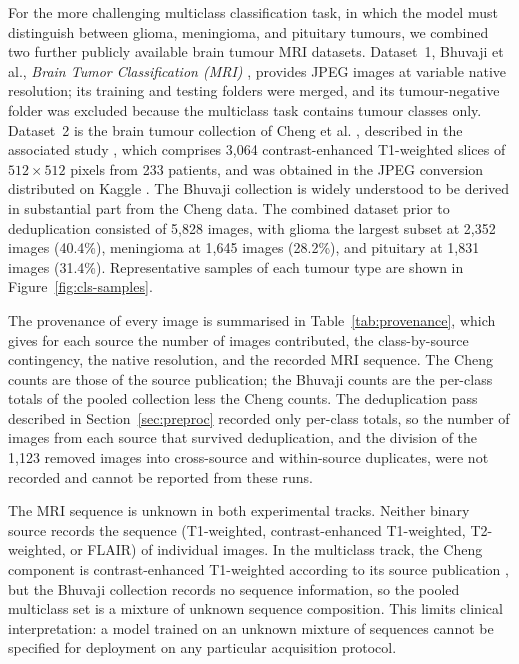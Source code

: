 \documentclass[final,3p,times,number]{elsarticle}
\begin{document}
For the more challenging multiclass classification task, in which the model must distinguish between glioma, meningioma, and pituitary tumours, we combined two further publicly available brain tumour MRI datasets. Dataset~1, Bhuvaji et al., \textit{Brain Tumor Classification (MRI)} \cite{ds3}, provides JPEG images at variable native resolution; its training and testing folders were merged, and its tumour-negative folder was excluded because the multiclass task contains tumour classes only. Dataset~2 is the brain tumour collection of Cheng et al. \cite{ds4}, described in the associated study \cite{ref5}, which comprises 3,064 contrast-enhanced T1-weighted slices of $512\times 512$ pixels from 233 patients, and was obtained in the JPEG conversion distributed on Kaggle \cite{ds5}. The Bhuvaji collection is widely understood to be derived in substantial part from the Cheng data. The combined dataset prior to deduplication consisted of 5,828 images, with glioma the largest subset at 2,352 images (40.4\%), meningioma at 1,645 images (28.2\%), and pituitary at 1,831 images (31.4\%). Representative samples of each tumour type are shown in Figure~\ref{fig:cls-samples}.

The provenance of every image is summarised in Table~\ref{tab:provenance}, which gives for each source the number of images contributed, the class-by-source contingency, the native resolution, and the recorded MRI sequence. The Cheng counts are those of the source publication; the Bhuvaji counts are the per-class totals of the pooled collection less the Cheng counts. The deduplication pass described in Section~\ref{sec:preproc} recorded only per-class totals, so the number of images from each source that survived deduplication, and the division of the 1,123 removed images into cross-source and within-source duplicates, were not recorded and cannot be reported from these runs.

The MRI sequence is unknown in both experimental tracks. Neither binary source records the sequence (T1-weighted, contrast-enhanced T1-weighted, T2-weighted, or FLAIR) of individual images. In the multiclass track, the Cheng component is contrast-enhanced T1-weighted according to its source publication \cite{ref5}, but the Bhuvaji collection records no sequence information, so the pooled multiclass set is a mixture of unknown sequence composition. This limits clinical interpretation: a model trained on an unknown mixture of sequences cannot be specified for deployment on any particular acquisition protocol.
\end{document}
